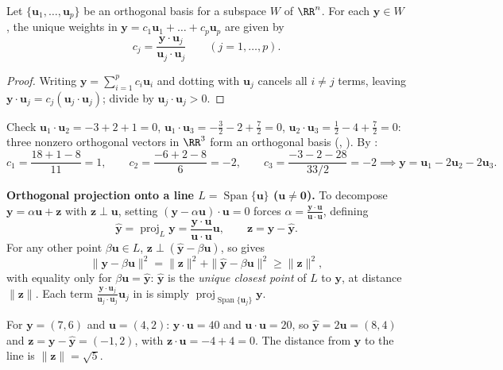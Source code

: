 \documentclass[10pt]{scrartcl}
\newcommand{\vv}[1]{\mathbf{#1}}
\DeclareMathOperator{\spn}{Span}\DeclareMathOperator{\Nul}{Nul}\DeclareMathOperator{\Col}{Col}\DeclareMathOperator{\Row}{Row}\DeclareMathOperator{\tr}{tr}\DeclareMathOperator{\proj}{proj}\DeclareMathOperator{\dist}{dist}
\begin{document}
\begin{theorem*}
  Let $\{\vv u_1,\dots,\vv u_p\}$ be an orthogonal basis for a subspace $W$ of $\RR^n$. For each $\vv y\in W$, the unique weights in $\vv y=c_1\vv u_1+\dots+c_p\vv u_p$ are given by
  \[
    c_j = \frac{\vv y\cdot\vv u_j}{\vv u_j\cdot\vv u_j} \qquad (j=1,\dots,p).
  \]
\end{theorem*}
\begin{proof}
  Writing $\vv y=\sum_{i=1}^p c_i\vv u_i$ and dotting with $\vv u_j$ cancels all $i\ne j$ terms, leaving $\vv y\cdot\vv u_j = c_j(\vv u_j\cdot\vv u_j)$; divide by $\vv u_j\cdot\vv u_j>0$.
\end{proof}

\revisit[ (part 1)] Check $\vv u_1\cdot\vv u_2=-3+2+1=0$, $\vv u_1\cdot\vv u_3=-\frac32-2+\frac72=0$, $\vv u_2\cdot\vv u_3=\frac12-4+\frac72=0$: three nonzero orthogonal vectors in $\RR^3$ form an orthogonal basis (, ). By :
\[
  c_1 = \frac{18+1-8}{11}=1, \qquad c_2 = \frac{-6+2-8}{6}=-2, \qquad c_3 = \frac{-3-2-28}{33/2}=-2 \implies \vv y=\vv u_1-2\vv u_2-2\vv u_3.
\]

\medskip\noindent\textbf{Orthogonal projection onto a line $L=\spn\{\vv u\}$ ($\vv u\neq\vv 0$).} To decompose $\vv y=\alpha\vv u+\vv z$ with $\vv z\perp\vv u$, setting $(\vv y-\alpha\vv u)\cdot\vv u=0$ forces $\alpha=\frac{\vv y\cdot\vv u}{\vv u\cdot\vv u}$, defining
\[
  \hat{\vv y} = \proj_L\vv y = \frac{\vv y\cdot\vv u}{\vv u\cdot\vv u}\vv u, \qquad \vv z = \vv y - \hat{\vv y}.
\]
For any other point $\beta\vv u\in L$, $\vv z\perp(\hat{\vv y}-\beta\vv u)$, so  gives
\[
  \|\vv y-\beta\vv u\|^2 = \|\vv z\|^2 + \|\hat{\vv y}-\beta\vv u\|^2 \ge \|\vv z\|^2,
\]
with equality only for $\beta\vv u=\hat{\vv y}$: $\hat{\vv y}$ is the \emph{unique closest point} of $L$ to $\vv y$, at distance $\|\vv z\|$. Each term $\frac{\vv y\cdot\vv u_j}{\vv u_j\cdot\vv u_j}\vv u_j$ in  is simply $\proj_{\spn\{\vv u_j\}}\vv y$.

\revisit[ (part 2)] For $\vv y=(7,6)$ and $\vv u=(4,2)$: $\vv y\cdot\vv u=40$ and $\vv u\cdot\vv u=20$, so $\hat{\vv y}=2\vv u=(8,4)$ and $\vv z=\vv y-\hat{\vv y}=(-1,2)$, with $\vv z\cdot\vv u=-4+4=0$. The distance from $\vv y$ to the line is $\|\vv z\|=\sqrt{5}$.
\end{document}
